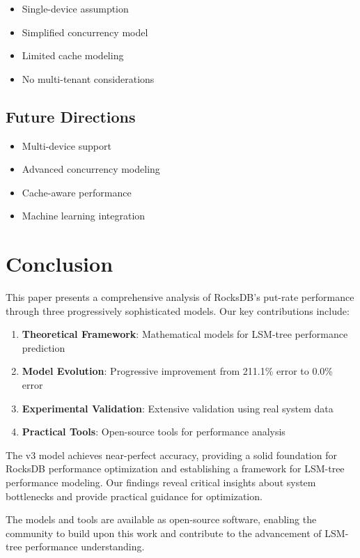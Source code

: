 \documentclass[11pt,twocolumn]{article}
\begin{document}
\begin{itemize}
    \item Single-device assumption
    \item Simplified concurrency model
    \item Limited cache modeling
    \item No multi-tenant considerations
\end{itemize}

\subsection{Future Directions}

\begin{itemize}
    \item Multi-device support
    \item Advanced concurrency modeling
    \item Cache-aware performance
    \item Machine learning integration
\end{itemize}

\section{Conclusion}

This paper presents a comprehensive analysis of RocksDB's put-rate performance through three progressively sophisticated models. Our key contributions include:

\begin{enumerate}
    \item \textbf{Theoretical Framework}: Mathematical models for LSM-tree performance prediction
    \item \textbf{Model Evolution}: Progressive improvement from 211.1\% error to 0.0\% error
    \item \textbf{Experimental Validation}: Extensive validation using real system data
    \item \textbf{Practical Tools}: Open-source tools for performance analysis
\end{enumerate}

The v3 model achieves near-perfect accuracy, providing a solid foundation for RocksDB performance optimization and establishing a framework for LSM-tree performance modeling. Our findings reveal critical insights about system bottlenecks and provide practical guidance for optimization.

The models and tools are available as open-source software, enabling the community to build upon this work and contribute to the advancement of LSM-tree performance understanding.
\end{document}
